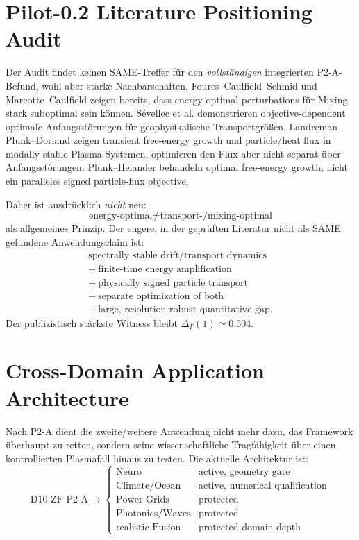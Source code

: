 \section{Pilot-0.2 Literature Positioning Audit}
Der Audit findet keinen SAME-Treffer für den \emph{vollständigen} integrierten P2-A-Befund, wohl aber starke Nachbarschaften. Foures--Caulfield--Schmid und Marcotte--Caulfield zeigen bereits, dass energy-optimal perturbations für Mixing stark suboptimal sein können. Sévellec et al. demonstrieren objective-dependent optimale Anfangsstörungen für geophysikalische Transportgrößen. Landreman--Plunk--Dorland zeigen transient free-energy growth und particle/heat flux in modally stable Plasma-Systemen, optimieren den Flux aber nicht separat über Anfangsstörungen. Plunk--Helander behandeln optimal free-energy growth, nicht ein paralleles signed particle-flux objective.

Daher ist ausdrücklich \emph{nicht} neu:
\[
\text{energy-optimal}\neq\text{transport-/mixing-optimal}
\]
als allgemeines Prinzip. Der engere, in der geprüften Literatur nicht als SAME gefundene Anwendungsclaim ist:
\[
\boxed{
\begin{gathered}
\text{spectrally stable drift/transport dynamics}\\
+\ \text{finite-time energy amplification}\\
+\ \text{physically signed particle transport}\\
+\ \text{separate optimization of both}\\
+\ \text{large, resolution-robust quantitative gap}.
\end{gathered}}
\]
Der publizistisch stärkste Witness bleibt $\Delta_\Gamma(1)\simeq0.504$.

\section{Cross-Domain Application Architecture}
Nach P2-A dient die zweite/weitere Anwendung nicht mehr dazu, das Framework überhaupt zu retten, sondern seine wissenschaftliche Tragfähigkeit über einen kontrollierten Plasmafall hinaus zu testen. Die aktuelle Architektur ist:
\[
\boxed{
\text{D10-ZF P2-A}
\longrightarrow
\begin{cases}
\text{Neuro} & \text{active, geometry gate}\\
\text{Climate/Ocean} & \text{active, numerical qualification}\\
\text{Power Grids} & \text{protected}\\
\text{Photonics/Waves} & \text{protected}\\
\text{realistic Fusion} & \text{protected domain-depth}
\end{cases}}
\]
